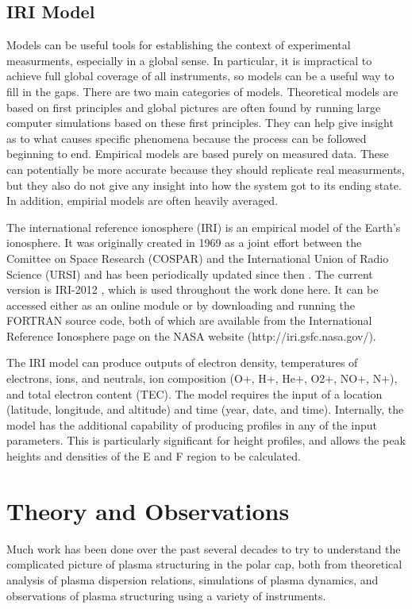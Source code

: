\subsection{IRI Model}
\label{sec:iri}
Models can be useful tools for establishing the context of experimental measurments, especially in a global sense.  In particular, it is impractical to achieve full global coverage of all instruments, so models can be a useful way to fill in the gaps.  There are two main categories of models.  Theoretical models are based on first principles and global pictures are often found by running large computer simulations based on these first principles.  They can help give insight as to what causes specific phenomena because the process can be followed beginning to end.  Empirical models are based purely on measured data.  These can potentially be more accurate because they should replicate real measurments, but they also do not give any insight into how the system got to its ending state.  In addition, empirial models are often heavily averaged.

The international reference ionosphere (IRI) is an empirical model of the Earth's ionosphere.  It was originally created in 1969 as a joint effort between the Comittee on Space Research (COSPAR) and the International Union of Radio Science (URSI) and has been periodically updated since then \citep{Rawer1978}.  The current version is IRI-2012 \citep{Bilitza2014}, which is used throughout the work done here.  It can be accessed either as an online module or by downloading and running the FORTRAN source code, both of which are available from the International Reference Ionosphere page on the NASA website (http://iri.gsfc.nasa.gov/).

The IRI model can produce outputs of electron density, temperatures of electrons, ions, and neutrals, ion composition (O+, H+, He+, O2+, NO+, N+), and total electron content (TEC).  The model requires the input of a location (latitude, longitude, and altitude) and time (year, date, and time).  Internally, the model has the additional capability of producing profiles in any of the input parameters.  This is particularly significant for height profiles, and allows the peak heights and densities of the E and F region to be calculated.


\section{Theory and Observations}
Much work has been done over the past several decades to try to understand the complicated picture of plasma structuring in the polar cap, both from theoretical analysis of plasma dispersion relations, simulations of plasma dynamics, and observations of plasma structuring using a variety of instruments.

